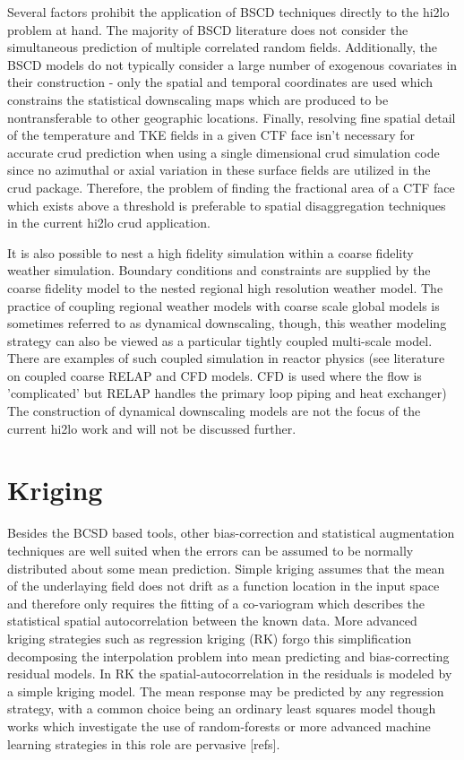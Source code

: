 Several factors prohibit the application of BSCD techniques directly to the hi2lo problem at hand.  The majority of BSCD literature does not consider the simultaneous prediction of multiple correlated random fields.  Additionally, the BSCD models do not typically consider a large number of exogenous covariates in their construction - only the spatial and temporal coordinates are used which constrains the statistical downscaling maps which are produced to be nontransferable to other geographic locations.  Finally, resolving fine spatial detail of the temperature and TKE fields in a given CTF face isn't necessary for accurate crud prediction when using a single dimensional crud simulation code since no azimuthal or axial variation in these surface fields are utilized in the crud package.  Therefore, the problem of finding the fractional area of a CTF face which exists above a threshold is preferable to spatial disaggregation techniques in the current hi2lo crud application.


It is also possible to nest a high fidelity simulation within a coarse fidelity weather simulation. Boundary conditions and constraints are supplied by the coarse fidelity model to the nested regional high resolution weather model.  The practice of coupling regional weather models with coarse scale global models is sometimes referred to as dynamical downscaling, though, this weather modeling strategy can also be viewed as a particular tightly coupled multi-scale model.  There are examples of such coupled simulation in reactor physics (see literature on coupled coarse RELAP and CFD models.  CFD is used where the flow is 'complicated' but RELAP handles the primary loop piping and heat exchanger)  The construction of dynamical downscaling models are not the focus of the current hi2lo work and will not be discussed further.

\section{Kriging}

Besides the BCSD based tools, other bias-correction and statistical augmentation techniques are well suited when the errors can be assumed to be normally distributed about some mean prediction.  Simple kriging assumes that the mean of the underlaying field does not drift as a function location in the input space and therefore only requires the fitting of a co-variogram which describes the statistical spatial autocorrelation between the known data.  More advanced kriging strategies such as regression kriging (RK) forgo this simplification decomposing the interpolation problem into mean predicting and bias-correcting residual models.  In RK the spatial-autocorrelation in the residuals is modeled by a simple kriging model.  The mean response may be predicted by any regression strategy, with a common choice being an ordinary least squares model though works which investigate the use of random-forests or more advanced machine learning strategies in this role are pervasive [refs].

